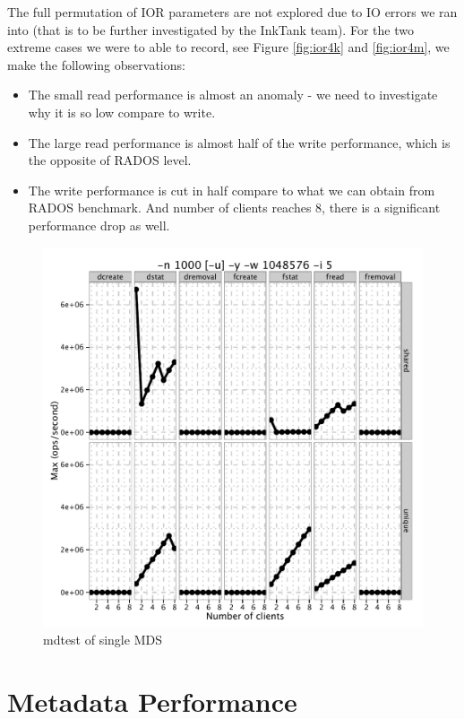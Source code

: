 \documentclass{article}
\begin{document}
The full permutation of IOR parameters are not explored due to IO errors we ran
into (that is to be further investigated by the InkTank team). For the two
extreme cases we were to able to record, see Figure \ref{fig:ior4k} and
\ref{fig:ior4m}, we make the following observations:

\begin{itemize}
  \item The small read performance is almost an anomaly - we need to
  investigate why it is so low compare to write.
  \item The large read performance is almost half of the write performance,
  which is the opposite of RADOS level. 
  \item The write performance is cut in half compare to what we can obtain from
  RADOS benchmark. And number of clients reaches 8, there is a significant
  performance drop as well. 
\end{itemize}

\begin{figure}[htb]
\centering
\includegraphics[width=5in]{data/mdtest}
\caption{mdtest of single MDS}
\label{fig:mdtest1c}
\end{figure}

\section{Metadata Performance}
\end{document}
